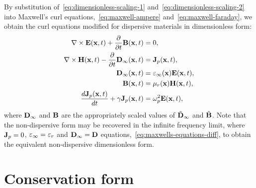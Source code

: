 By substitution of~\eqref{eq:dimensionless-scaling-1} and~\eqref{eq:dimensionless-scaling-2} into Maxwell's curl
equations,~\eqref{eq:maxwell-ampere} and~\eqref{eq:maxwell-faraday}, we obtain
the curl equations modified for dispersive materials in dimensionless form:
\begin{subequations}
  \label{eq:dimensionless-maxwell}
  \begin{align}
    \nabla \times \mathbf{E}(\mathbf{x},t) + \frac{\partial}{\partial t} \mathbf{B}(\mathbf{x}, t) &= 0, \\
    \nabla \times \mathbf{H}(\mathbf{x},t) - \frac{\partial}{\partial t}  \mathbf{D}_{\infty}(\mathbf{x}, t) &=  \mathbf{J}_p(\mathbf{x},t), \\
    \mathbf{D}_{\infty}(\mathbf{x},t) &= \varepsilon_{\infty}(\mathbf{x}) \mathbf{E}(\mathbf{x},t), \\
    \mathbf{B}(\mathbf{x},t) &= \mu_r(\mathbf{x}) \mathbf{H}(\mathbf{x},t), \\
    \frac{d \mathbf{J}_p(\mathbf{x},t)}{dt} + \gamma \mathbf{J}_p(\mathbf{x},t) &= \omega_p^2 \mathbf{E}(\mathbf{x},t),
  \end{align}
\end{subequations}
where $\mathbf{D}_{\infty}$ and $\mathbf{B}$ are the appropriately scaled values of $\tilde{\mathbf{D}}_{\infty}$ and
$\tilde{\mathbf{B}}$. Note that the non-dispersive form may be recovered in the infinite
frequency limit, where $\mathbf{J}_p = 0$, $\varepsilon_{\infty} = \varepsilon_r$ and $\mathbf{D}_{\infty} = \mathbf{D}$
equations,~\eqref{eq:maxwells-equations-diff}, to obtain the equivalent
non-dispersive dimensionless form.

\section{Conservation form}

